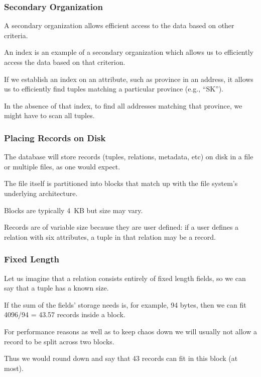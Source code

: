 \begin{frame}
\frametitle{Secondary Organization}

A \alert{secondary organization} allows efficient access to the data based on other criteria. 

An index is an example of a secondary organization which allows us to efficiently access the data based on that criterion. 

If we establish an index on an attribute, such as province in an address, it allows us to efficiently find tuples matching a particular province (e.g., ``SK'').

In the absence of that index, to find all addresses matching that province, we might have to scan all tuples.

\end{frame}


\begin{frame}
\frametitle{Placing Records on Disk}

The database will store records (tuples, relations, metadata, etc) on disk in a file or multiple files, as one would expect. 

The file itself is partitioned into blocks that match up with the file system's underlying architecture. 

Blocks are typically 4~KB but size may vary. 

Records are of variable size because they are user defined: if a user defines a relation with six attributes, a tuple in that relation may be a record.

\end{frame}



\begin{frame}
\frametitle{Fixed Length}

Let us imagine that a relation consists entirely of fixed length fields, so we can say that a tuple has a known size. 

If the sum of the fields' storage needs is, for example, 94 bytes, then we can fit 4096/94 = 43.57 records inside a block. 

For performance reasons as well as to keep chaos down we will usually not allow a record to be split across two blocks. 

Thus we would round down and say that 43 records can fit in this block (at most).

\end{frame}



